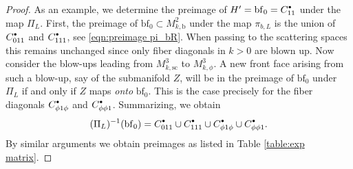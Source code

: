 \documentclass[11pt]{article}
\numberwithin{equation}{section}
\newcommand{\bbullet}{{\scriptscriptstyle\bullet}}
\newcommand{\sbullet}{{\raisebox{1pt}{$\bbullet$}}}
\theoremstyle{plain}
\theoremstyle{definition}
\newcommand{\bb}{{\mathrm{b}}}
\newcommand{\bbf}{{\mathrm{bf}}}
\newcommand{\ssc}{{\mathrm{sc}}}
\begin{document}
\begin{proof}
As an example, we determine the preimage of $H'=\bbf_0 = C_{11}^\sbullet$ under the map $\Pi_L$. First, the preimage of $\bbf_0\subset M^2_{k,\bb}$ under the map $\pi_{b,L}$ is the union of $C_{011}^\sbullet$ and $C_{111}^\sbullet$, see \eqref{eqn:preimage pi_bR}.
When passing to the scattering spaces this remains unchanged since only fiber diagonals in $k>0$ are blown up.
Now consider the blow-ups leading from $M^3_{k,\ssc}$ to $M^3_{k,\phi}$.
A new front face arising from such a blow-up, say of the submanifold $Z$, will be in the preimage of $\bbf_0$ under $\Pi_L$ if and only if $Z$ maps \textit{onto} $\bbf_0$. This is the case precisely for the fiber diagonals $C_{\phi1\phi}^\sbullet$ and $C_{\phi\phi1}^\sbullet$. Summarizing, we obtain
\[
(\Pi_L)^{-1}(\bbf_0) = C_{011}^\sbullet \cup C_{111}^\sbullet \cup C_{\phi1\phi}^\sbullet \cup C_{\phi\phi1}^\sbullet.
\]
By similar arguments we obtain preimages as listed in Table \ref{table:exp matrix}.


\end{proof}
\end{document}
